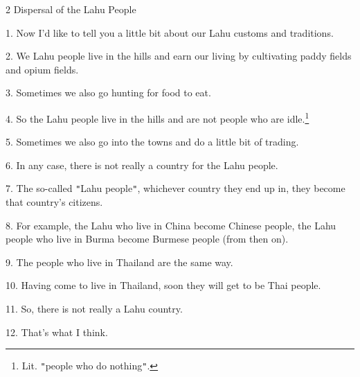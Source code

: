 
2 Dispersal of the Lahu People

1. Now I'd like to tell you a little bit about our Lahu customs and traditions.

2. We Lahu people live in the hills and earn our living by cultivating paddy fields
and opium fields.

3. Sometimes we also go hunting for food to eat.

4. So the Lahu people live in the hills and are not people who are idle.\footnote{Lit. \texttt{"}people who do nothing\texttt{"}.}

5. Sometimes we also go into the towns and do a little bit of trading.

6. In any case, there is not really a country for the Lahu people.

7. The so-called \texttt{"}Lahu people\texttt{"}, whichever country they end up
in, they become that country's citizens.

8. For example, the Lahu who live in China become Chinese people, the Lahu people
who live in Burma become Burmese people (from then on).

9. The people who live in Thailand are the same way.

10. Having come to live in Thailand, soon they will get to be Thai people.

11. So, there is not really a Lahu country.

12. That's what I think.


